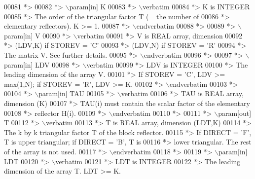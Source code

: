 \begin{DoxyCode}
00081 \textcolor{comment}{*>}
00082 \textcolor{comment}{*> \(\backslash\)param[in] K}
00083 \textcolor{comment}{*> \(\backslash\)verbatim}
00084 \textcolor{comment}{*>          K is INTEGER}
00085 \textcolor{comment}{*>          The order of the triangular factor T (= the number of}
00086 \textcolor{comment}{*>          elementary reflectors). K >= 1.}
00087 \textcolor{comment}{*> \(\backslash\)endverbatim}
00088 \textcolor{comment}{*>}
00089 \textcolor{comment}{*> \(\backslash\)param[in] V}
00090 \textcolor{comment}{*> \(\backslash\)verbatim}
00091 \textcolor{comment}{*>          V is REAL array, dimension}
00092 \textcolor{comment}{*>                               (LDV,K) if STOREV = 'C'}
00093 \textcolor{comment}{*>                               (LDV,N) if STOREV = 'R'}
00094 \textcolor{comment}{*>          The matrix V. See further details.}
00095 \textcolor{comment}{*> \(\backslash\)endverbatim}
00096 \textcolor{comment}{*>}
00097 \textcolor{comment}{*> \(\backslash\)param[in] LDV}
00098 \textcolor{comment}{*> \(\backslash\)verbatim}
00099 \textcolor{comment}{*>          LDV is INTEGER}
00100 \textcolor{comment}{*>          The leading dimension of the array V.}
00101 \textcolor{comment}{*>          If STOREV = 'C', LDV >= max(1,N); if STOREV = 'R', LDV >= K.}
00102 \textcolor{comment}{*> \(\backslash\)endverbatim}
00103 \textcolor{comment}{*>}
00104 \textcolor{comment}{*> \(\backslash\)param[in] TAU}
00105 \textcolor{comment}{*> \(\backslash\)verbatim}
00106 \textcolor{comment}{*>          TAU is REAL array, dimension (K)}
00107 \textcolor{comment}{*>          TAU(i) must contain the scalar factor of the elementary}
00108 \textcolor{comment}{*>          reflector H(i).}
00109 \textcolor{comment}{*> \(\backslash\)endverbatim}
00110 \textcolor{comment}{*>}
00111 \textcolor{comment}{*> \(\backslash\)param[out] T}
00112 \textcolor{comment}{*> \(\backslash\)verbatim}
00113 \textcolor{comment}{*>          T is REAL array, dimension (LDT,K)}
00114 \textcolor{comment}{*>          The k by k triangular factor T of the block reflector.}
00115 \textcolor{comment}{*>          If DIRECT = 'F', T is upper triangular; if DIRECT = 'B', T is}
00116 \textcolor{comment}{*>          lower triangular. The rest of the array is not used.}
00117 \textcolor{comment}{*> \(\backslash\)endverbatim}
00118 \textcolor{comment}{*>}
00119 \textcolor{comment}{*> \(\backslash\)param[in] LDT}
00120 \textcolor{comment}{*> \(\backslash\)verbatim}
00121 \textcolor{comment}{*>          LDT is INTEGER}
00122 \textcolor{comment}{*>          The leading dimension of the array T. LDT >= K.}

\end{DoxyCode}
